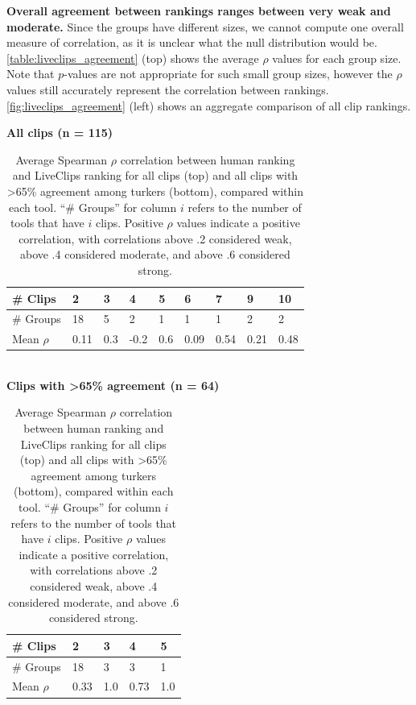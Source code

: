\textbf{Overall agreement between rankings ranges between very weak and moderate.} Since the groups have different sizes, we cannot compute one overall measure of correlation, as it is unclear what the null distribution would be. \autoref{table:liveclips_agreement} (top) shows the average $\rho$ values for each group size. Note that $p$-values are not appropriate for such small group sizes, however the $\rho$ values still accurately represent the correlation between rankings. \autoref{fig:liveclips_agreement} (left) shows an aggregate comparison of all clip rankings. 

\begin{table}[t!]
\small
\centering
\caption[Average Spearman $\rho$ correlation between human ranking and LiveClips ranking for all clips (top) and all clips with >65\% agreement among turkers (bottom), compared within each tool.]{Average Spearman $\rho$ correlation between human ranking and LiveClips ranking for all clips (top) and all clips with >65\% agreement among turkers (bottom), compared within each tool. ``\# Groups'' for column $i$ refers to the number of tools that have $i$ clips. Positive $\rho$ values indicate a positive correlation, with correlations above .2 considered weak, above .4 considered moderate, and above .6 considered strong.}
\label{table:liveclips_agreement}
\textbf{All clips (n = 115)}\\
\vspace{5pt}
\begin{tabular}{l|llllllll}
\# Clips & 2    & 3 & 4 & 5   & 6    & 7    & 9    & 10   \\ \hline
\# Groups           & 18   & 5 & 2 & 1   & 1    & 1    & 2    & 2    \\
Mean $\rho$  & 0.11 & 0.3 & -0.2 & 0.6 & 0.09 & 0.54 & 0.21 & 0.48
\end{tabular}\\
\vspace{5pt}
\textbf{Clips with >65\% agreement (n = 64)}\\
\vspace{5pt}
\begin{tabular}{l|llll}
\# Clips & 2    & 3   & 4    & 5   \\ \hline
\# Groups           & 18   & 3   & 3    & 1   \\
Mean $\rho$  & 0.33 & 1.0 & 0.73 & 1.0
\end{tabular}
\end{table}

